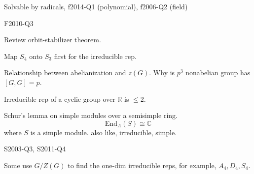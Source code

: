 \documentclass[openany]{book}
\newcommand{\R}{\mathbb{R}}
\newcommand{\C}{\mathbb{C}}
\begin{document}
\begin{prob}
    Solvable by radicals, f2014-Q1 (polynomial), f2006-Q2 (field)
\end{prob}

\begin{prob}
    F2010-Q3
\end{prob}

\begin{prob}
    Review orbit-stabilizer theorem.
\end{prob}


\begin{prob}
    Map $S_4$ onto $S_3$ first for the irreducible rep.
\end{prob}

\begin{prob}
    Relationship between abelianization and $z(G)$. Why is $p^3$ nonabelian group has $[G,G]=p$. 
\end{prob}


\begin{prob}
    Irreducible rep of a cyclic group over $\R$ is $\leq 2$.
\end{prob}

\begin{prob}
    Schur's lemma on simple modules over a semisimple ring. 
    \begin{equation*}
        \text{End}_A(S)\cong\C
    \end{equation*}
    where $S$ is a simple module. also like, irreducible, simple.
\end{prob}

\begin{prob}
    S2003-Q3, S2011-Q4
\end{prob}

\begin{prob}
    Some use $G/Z(G)$ to find the one-dim irreducible reps, for example, $A_4, D_4, S_4$.
\end{prob}
\end{document}
